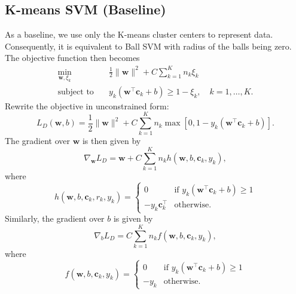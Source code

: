 \documentclass[12pt]{article}
\newcommand{\bc}{\mathbf{c}}
\newcommand{\bw}{\mathbf{w}}
\newcommand{\tx}{\tilde{x}}
\begin{document}
\subsection{K-means SVM (Baseline)}
As a baseline, we use only the K-means cluster centers to represent data. Consequently, it is equivalent to Ball SVM with radius of the balls being zero. The objective function then becomes
\begin{align}
\min_{\bw, \xi_k} &\quad\frac{1}{2} \| \bw \|^2 + C \sum_{k=1}^K n_k \xi_k \nonumber\\
\text{subject to} &\quad y_k(\bw^{\top}\bc_k + b) \ge 1 - \xi_k, \quad k = 1, \ldots, K.
\label{eq:ksvm}
\end{align}
Rewrite the objective in unconstrained form:
\begin{equation}
L_D(\bw, b) = \frac{1}{2}\|\bw\|^2 + C\sum_{k=1}^Kn_k\max[0, 1 - y_k(\bw^{\top}\bc_k +b)].
\end{equation}
The gradient over $\bw$ is then given by
$$
\nabla_{\bw} L_D = \bw + C\sum_{k=1}^K n_k h(\bw, b, \bc_k, y_k),
$$
where
$$
h(\bw, b, \bc_k, r_k, y_k) = 
  \begin{cases}
   0 & \text{if } y_k(\bw^{\top}\bc_k +b)\ge 1  \\
   -y_k\bc_k^{\top} & \text{otherwise}.
  \end{cases}
$$
Similarly, the gradient over $b$ is given by
$$
\nabla_{b} L_D = C\sum_{k=1}^K n_k f(\bw, b, \bc_k, y_k),
$$
where
$$
f(\bw, b, \bc_k, y_k) = 
  \begin{cases}
   0 & \text{if } y_k(\bw^{\top}\bc_k +b) \ge 1  \\
   -y_k & \text{otherwise}.
  \end{cases}
$$
\end{document}
